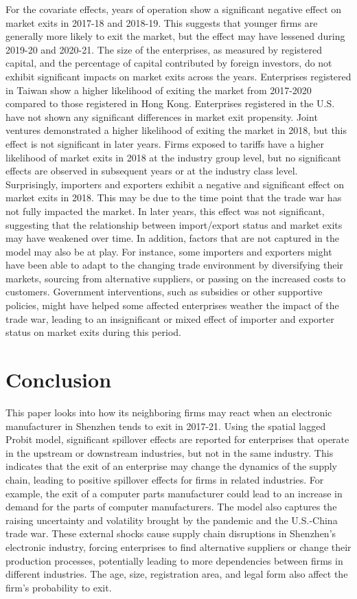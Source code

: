 For the covariate effects, years of operation show a significant negative effect on market exits in 2017-18 and 2018-19. This suggests that younger firms are generally more likely to exit the market, but the effect may have lessened during 2019-20 and 2020-21. The size of the enterprises, as measured by registered capital, and the percentage of capital contributed by foreign investors, do not exhibit significant impacts on market exits across the years. Enterprises registered in Taiwan show a higher likelihood of exiting the market from 2017-2020 compared to those registered in Hong Kong. Enterprises registered in the U.S. have not shown any significant differences in market exit propensity. Joint ventures demonstrated a higher likelihood of exiting the market in 2018, but this effect is not significant in later years. Firms exposed to tariffs have a higher likelihood of market exits in 2018 at the industry group level, but no significant effects are observed in subsequent years or at the industry class level. Surprisingly, importers and exporters exhibit a negative and significant effect on market exits in 2018. This may be due to the time point that the trade war has not fully impacted the market. In later years, this effect was not significant, suggesting that the relationship between import/export status and market exits may have weakened over time. In addition, factors that are not captured in the model may also be at play. For instance, some importers and exporters might have been able to adapt to the changing trade environment by diversifying their markets, sourcing from alternative suppliers, or passing on the increased costs to customers. Government interventions, such as subsidies or other supportive policies, might have helped some affected enterprises weather the impact of the trade war, leading to an insignificant or mixed effect of importer and exporter status on market exits during this period.

\section{Conclusion}

This paper looks into how its neighboring firms may react when an electronic manufacturer in Shenzhen tends to exit in 2017-21. Using the spatial lagged Probit model, significant spillover effects are reported for enterprises that operate in the upstream or downstream industries, but not in the same industry. This indicates that the exit of an enterprise may change the dynamics of the supply chain, leading to positive spillover effects for firms in related industries. For example, the exit of a computer parts manufacturer could lead to an increase in demand for the parts of computer manufacturers. The model also captures the raising uncertainty and volatility brought by the pandemic and the U.S.-China trade war. These external shocks cause supply chain disruptions in Shenzhen's electronic industry, forcing enterprises to find alternative suppliers or change their production processes, potentially leading to more dependencies between firms in different industries. The age, size, registration area, and legal form also affect the firm's probability to exit.

